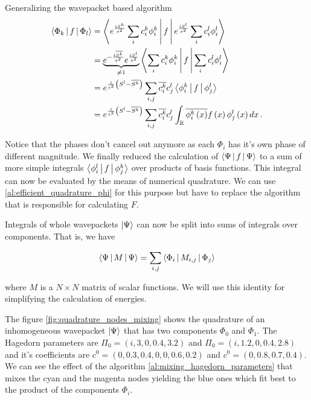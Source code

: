 \begin{chapter}{Generalizing the wavepacket based algorithm}
\begin{equation} \label{eq:inner_product_multi_families}
\begin{split}
  \Braket{ \Phi_k | f | \Phi_l } & = \Braket{e^{\frac{iS^k}{\varepsilon^2}} \sum_i c^k_i \phi^k_i |
                                     f | e^{\frac{iS^l}{\varepsilon^2}} \sum_i c^l_i \phi^l_i} \nonumber \\
                                 & = \underbrace{e^{-\frac{i\overline{S^k}}{\varepsilon^2}} e^{\frac{iS^l}{\varepsilon^2}}}_{\neq 1}
                                     \Braket{\sum_i c^k_i \phi^k_i | f | \sum_i c^l_i \phi^l_i} \nonumber \\
                                 & = e^{\frac{i}{\varepsilon^2}\left(S^l-\overline{S^k}\right)}
                                     \sum_{i,j} \overline{c^k_i} c^l_j \Braket{\phi^k_i | f | \phi^l_j} \nonumber \\
                                 & = e^{\frac{i}{\varepsilon^2}\left(S^l-\overline{S^k}\right)}
                                     \sum_{i,j} \overline{c^k_i} c^l_j \int_\mathbb{R} \overline{\phi^k_i\left( x \right)} f\left( x \right) \phi^l_j\left( x \right) dx \,.
\end{split}
\end{equation}

Notice that the phases don't cancel out anymore as each $\Phi_i$ has it's own phase
of different magnitude. We finally reduced the calculation of $\Braket{\Psi | f | \Psi}$ to
a sum of more simple integrals $\Braket{\phi^l_i | f | \phi^k_j}$ over products
of basis functions. This integral can now be evaluated by the means of numerical
quadrature. We can use \ref{al:efficient_quadrature_phi} for this purpose but have
to replace the algorithm that is responsible for calculating $F$.

Integrals of whole wavepackets $\Ket{\Psi}$ can now be split into sums of integrals
over components. That is, we have

\begin{equation}
  \Braket{\Psi | M | \Psi} = \sum_{i,j} \Braket{\Phi_i | M_{i,j} | \Phi_j}
\end{equation}

where $M$ is a $N \times N$ matrix of scalar functions. We will use this identity
for simplifying the calculation of energies.

The figure \ref{fig:quadrature_nodes_mixing} shows the quadrature of an inhomogeneous
wavepacket $\Ket{\Psi}$ that has two components $\Phi_0$ and $\Phi_1$. The Hagedorn
parameters are $\Pi_0 = \left(i,3,0,0.4,3.2\right)$ and $\Pi_0 = \left(i,1.2,0,0.4,2.8\right)$ and
it's coefficients are $c^0 = \left(0,0.3,0.4,0,0,0.6,0.2\right)$ and $c^0 = \left(0,0.8,0.7,0.4\right)$.
We can see the effect of the algorithm \ref{al:mixing_hagedorn_parameters} that
mixes the cyan and the magenta nodes yielding the blue ones which fit best to the
product of the components $\Phi_i$.


\end{chapter}
